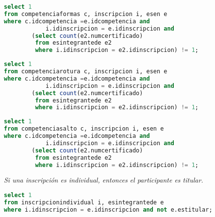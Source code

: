 \begin{lstlisting}[language=SQL]
select 1
from competenciaformas c, inscripcion i, esen e
where c.idcompetencia =e.idcompetencia and
            i.idinscripcion = e.idinscripcion and
	    (select count(e2.numcertificado)
	     from esintegrantede e2
	     where i.idinscripcion = e2.idinscripcion) != 1;
\end{lstlisting}

\begin{lstlisting}[language=SQL]
select 1
from competenciarotura c, inscripcion i, esen e
where c.idcompetencia =e.idcompetencia and
            i.idinscripcion = e.idinscripcion and
	    (select count(e2.numcertificado)
	     from esintegrantede e2
	     where i.idinscripcion = e2.idinscripcion) != 1;
\end{lstlisting}

\begin{lstlisting}[language=SQL]
select 1
from competenciasalto c, inscripcion i, esen e
where c.idcompetencia =e.idcompetencia and
            i.idinscripcion = e.idinscripcion and
	    (select count(e2.numcertificado)
	     from esintegrantede e2
	     where i.idinscripcion = e2.idinscripcion) != 1;
\end{lstlisting}

\emph{Si una inscripción es individual, entonces el participante es titular.}

\begin{lstlisting}[language=SQL]
select 1
from inscripcionindividual i, esintegrantede e
where i.idinscripcion = e.idinscripcion and not e.estitular;
\end{lstlisting}

